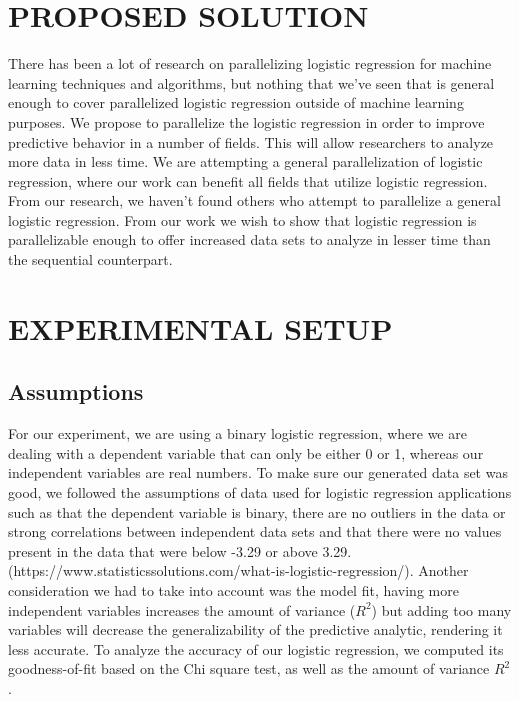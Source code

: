 \documentclass[letterpaper, 10 pt, conference]{ieeeconf}  %
\begin{document}
\section{PROPOSED SOLUTION}
There has been a lot of research on parallelizing logistic regression for machine learning techniques and algorithms, but nothing that we’ve seen that is general enough to cover parallelized logistic regression outside of machine learning purposes. We propose to parallelize the logistic regression in order to improve predictive behavior in a number of fields. This will allow researchers to analyze more data in less time. We are attempting a general parallelization of logistic regression, where our work can benefit all fields that utilize logistic regression. From our research, we haven’t found others who attempt to parallelize a general logistic regression. From our work we wish to show that logistic regression is parallelizable enough to offer increased data sets to analyze in lesser time than the sequential counterpart. 

\section{EXPERIMENTAL SETUP}

\subsection{Assumptions}
For our experiment, we are using a binary logistic regression, where we are dealing with a dependent variable that can only be either 0 or 1, whereas our independent variables are real numbers. To make sure our generated data set was good, we followed the assumptions of data used for logistic regression applications such as that the dependent variable is binary, there are no outliers in the data or strong correlations between independent data sets and that there were no values present in the data that were below -3.29 or above 3.29. (https://www.statisticssolutions.com/what-is-logistic-regression/). Another consideration we had to take into account was the model fit, having more independent variables increases the amount of variance ($R^2$) but adding too many variables will decrease the generalizability of the predictive analytic, rendering it less accurate. To analyze the accuracy of our logistic regression, we computed its goodness-of-fit based on the Chi square test, as well as the amount of variance $R^2$. 
\end{document}
